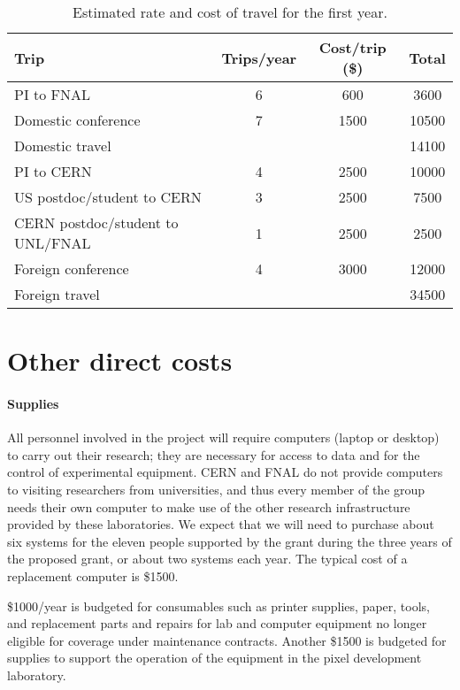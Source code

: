 \documentclass[11pt]{article}
\begin{document}
\begin{table}[h]
\centering
\begin{tabular}{|l|cc|c|}\hline
Trip &  Trips/year & Cost/trip (\$) & Total\\\hline
PI to FNAL & 6 & 600 & 3600\\ 
Domestic conference & 7 & 1500 & 10500\\\hline
Domestic travel & & & 14100\\\hline
PI to CERN & 4 & 2500 & 10000\\
US postdoc/student to CERN & 3 & 2500 &7500\\
CERN postdoc/student to UNL/FNAL & 1 & 2500 & 2500\\
Foreign conference & 4 & 3000 & 12000\\\hline 
Foreign travel & & & 34500\\\hline
\end{tabular}
\caption{Estimated rate and cost of travel for the first year.} 
\label{tab:trips}
\end{table}



\section{Other direct costs}

\paragraph{Supplies} All personnel involved in the project will
require computers (laptop or desktop) to carry out their research; they are
necessary for access to data and for the control of experimental equipment.
CERN and FNAL do not provide computers to visiting researchers from
universities, and thus every member of the group needs their own computer
to make use of the other research infrastructure provided by these
laboratories.  
We expect that we will need to purchase about six systems for the eleven
people supported by the grant during the three years of the proposed grant,
or about two systems each year.  The typical cost of a replacement
computer is \$1500.

\$1000/year is budgeted for consumables such as printer supplies, paper,
tools, and replacement parts and repairs for lab and computer equipment no
longer eligible for coverage under maintenance contracts.  Another \$1500
is budgeted for supplies to support the operation of the equipment in the
pixel development laboratory.
\end{document}
